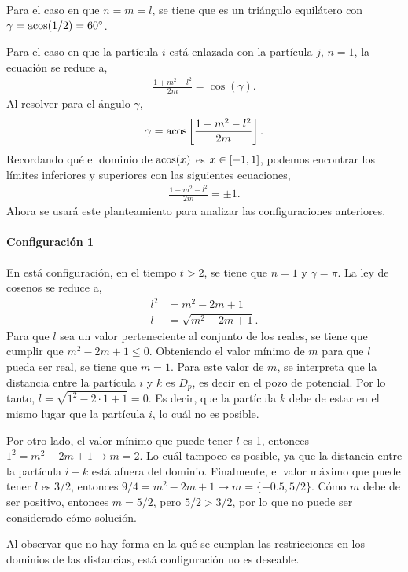 \documentclass[../main.tex]{subfiles}
\begin{document}
Para el caso en que $n=m=l$, se tiene que es un triángulo equilátero con \(\gamma=\acos(1/2)=\SI{60}{\degree}\).

Para el caso en que la partícula $i$ está enlazada con la partícula $j$, $n=1$, la ecuación se reduce a,
\begin{align*}
    \frac{1 + m^2 - l^2}{2m} = \cos(\gamma).
\end{align*}
Al resolver para el ángulo \(\gamma\),
\begin{align*}
    \gamma = \acos\left[\frac{1 + m^2 - l^2}{2m}\right].
\end{align*}
Recordando qué el dominio de \(\acos(x)\) es \(x\in\qty[-1,1]\), podemos encontrar los límites inferiores y superiores con las siguientes ecuaciones,
\begin{gather*}
    \frac{1 + m^2 - l^2}{2m} = \pm 1.
\end{gather*}
Ahora se usará este planteamiento para analizar las configuraciones anteriores.

\paragraph{Configuración 1} 
En está configuración, en el tiempo $t>2$, se tiene que \(n=1\) y \(\gamma=\pi\).
La ley de cosenos se reduce a,
\begin{align*}
    l^2 &= m^2 -2m + 1 \\
    l &= \sqrt{m^2 -2m + 1}.
\end{align*}
Para que $l$ sea un valor perteneciente al conjunto de los reales, se tiene que cumplir que $m^2 -2m + 1\leq0$.
Obteniendo el valor mínimo de $m$ para que $l$ pueda ser real, se tiene que \(m=1\).
Para este valor de $m$, se interpreta que la distancia entre la partícula $i$ y $k$ es $D_p$, es decir en el pozo de potencial.
Por lo tanto, \(l=\sqrt{1^2 -2\cdot1+1} = 0\).
Es decir, que la partícula $k$ debe de estar en el mismo lugar que la partícula $i$, lo cuál no es posible.

Por otro lado, el valor mínimo que puede tener $l$ es \num{1}, entonces \(1^2=m^2-2m+1\to m=2\).
Lo cuál tampoco es posible, ya que la distancia entre la partícula $i-k$ está afuera del dominio.
Finalmente, el valor máximo que puede tener $l$ es \(3/2\), entonces \(9/4=m^2-2m+1\to m=\{-0.5,5/2\}\).
Cómo $m$ debe de ser positivo, entonces \(m=5/2\), pero \(5/2>3/2\), por lo que no puede ser considerado cómo solución.

Al observar que no hay forma en la qué se cumplan las restricciones en los dominios de las distancias, está configuración no es deseable.
\end{document}
